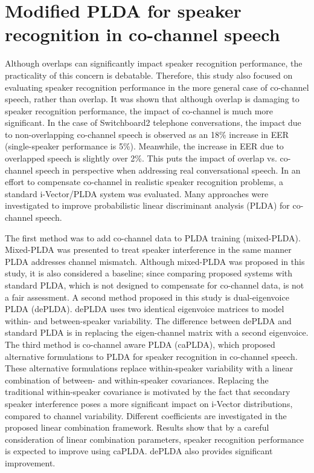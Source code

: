 \section{Modified PLDA for speaker recognition in co-channel speech}
Although overlaps can significantly impact speaker recognition performance, the practicality of this concern is debatable. 
Therefore, this study also focused on evaluating speaker recognition performance in the more general case of co-channel speech, rather than overlap. 
It was shown that although overlap is damaging to speaker recognition performance, the impact of co-channel is much more significant. 
In the case of Switchboard2 telephone conversations, the impact due to non-overlapping co-channel speech is observed as an 18\% increase in EER (single-speaker performance is 5\%). 
Meanwhile, the increase in EER due to overlapped speech is slightly over 2\%. 
This puts the impact of overlap vs. co-channel speech in perspective when addressing real conversational speech. 
In an effort to compensate co-channel in realistic speaker recognition problems, a standard i-Vector/PLDA system was evaluated. 
Many approaches were investigated to improve probabilistic linear discriminant analysis (PLDA) for co-channel speech. 

The first method was to add co-channel data to PLDA training (mixed-PLDA). 
Mixed-PLDA was presented to treat speaker interference in the same manner PLDA addresses channel mismatch. 
Although mixed-PLDA was proposed in this study, it is also considered a baseline; since comparing proposed systems with standard PLDA, which is not designed to compensate for co-channel data, is not a fair assessment. 
A second method proposed in this study is dual-eigenvoice PLDA (dePLDA). dePLDA uses two identical eigenvoice matrices to model within- and between-speaker variability. 
The difference between dePLDA and standard PLDA is in replacing the eigen-channel matrix with a second eigenvoice. 
The third method is co-channel aware PLDA (caPLDA), which proposed alternative formulations to PLDA for speaker recognition in co-channel speech. 
These alternative formulations replace within-speaker variability with a linear combination of between- and within-speaker covariances. 
Replacing the traditional within-speaker covariance is motivated by the fact that secondary speaker interference poses a more significant impact on i-Vector distributions, compared to channel variability. 
Different coefficients are investigated in the proposed linear combination framework. 
Results show that by a careful consideration of linear combination parameters, speaker recognition performance is expected to improve using caPLDA. 
dePLDA also provides significant improvement.  

